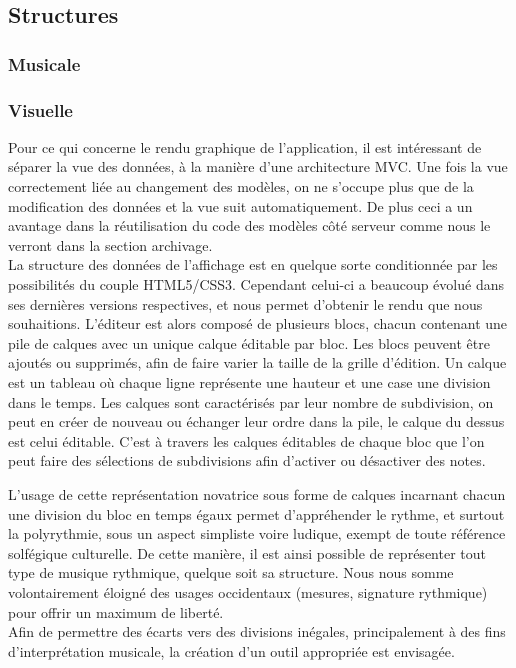\documentclass[12pt,a4paper]{article}
\begin{document}
\subsection{Structures}

\subsubsection{Musicale}

\subsubsection{Visuelle}

Pour ce qui concerne le rendu graphique de l’application, il est intéressant de séparer la vue des données, à la manière d’une architecture MVC. Une fois la vue correctement liée au changement des modèles, on ne s’occupe plus que de la modification des données et la vue suit automatiquement. De plus ceci a un avantage dans la réutilisation du code des modèles côté serveur comme nous le verront dans la section archivage.\\
La structure des données de l’affichage est en quelque sorte conditionnée par les possibilités du couple HTML5/CSS3. Cependant celui-ci a beaucoup évolué dans ses dernières versions respectives, et nous permet d’obtenir le rendu que nous souhaitions. L’éditeur est alors composé de plusieurs blocs, chacun contenant une pile de calques avec un unique calque éditable par bloc. Les blocs peuvent être ajoutés ou supprimés, afin de faire varier la taille de la grille d’édition. Un calque est un tableau où chaque ligne représente une hauteur et une case une division dans le temps. Les calques sont caractérisés par leur nombre de subdivision, on peut en créer de nouveau ou échanger leur ordre dans la pile, le calque du dessus est celui éditable. C’est à travers les calques éditables de chaque bloc que l’on peut faire des sélections de subdivisions afin d’activer ou désactiver des notes.

\bigskip
L’usage de cette représentation novatrice sous forme de calques incarnant chacun une division du bloc en temps égaux permet d’appréhender le rythme, et surtout la polyrythmie, sous un aspect simpliste voire ludique, exempt de toute référence solfégique culturelle. De cette manière, il est ainsi possible de représenter tout type de musique rythmique, quelque soit sa structure. Nous nous somme volontairement éloigné des usages occidentaux (mesures, signature rythmique) pour offrir un maximum de liberté.\\
Afin de permettre des écarts vers des divisions inégales, principalement à des fins d’interprétation musicale, la création d’un outil appropriée est envisagée.
\end{document}
